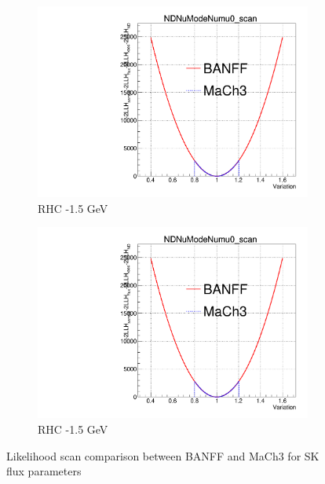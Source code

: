 \begin{figure}[h]
\begin{subfigure}[t]{0.24\textwidth}
	\end{subfigure}
	\begin{subfigure}[t]{0.24\textwidth}
		\includegraphics[width=\textwidth, trim={0mm 0mm 0mm 11mm}, clip,page=86]{figures/mach3/banff/Asimov_scan_20July_flux_Full_LLHscan_18July_BeRPA_U_ND280logL_scan}
		\caption{RHC -1.5 GeV}
	\end{subfigure}
	\begin{subfigure}[t]{0.24\textwidth}
		\includegraphics[width=\textwidth, trim={0mm 0mm 0mm 11mm}, clip,page=97]{figures/mach3/banff/Asimov_scan_20July_flux_Full_LLHscan_18July_BeRPA_U_ND280logL_scan}
		\caption{RHC -1.5 GeV}
	\end{subfigure}
	\caption{Likelihood scan comparison between BANFF and MaCh3 for SK flux parameters}
	\label{fig:banff_asimov_scan_SK_flux}
\end{figure}

